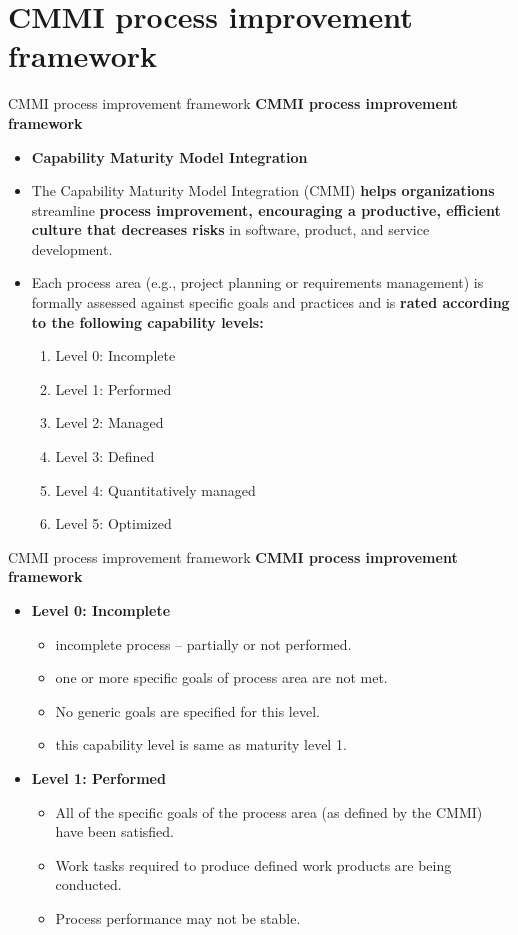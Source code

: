 \documentclass{beamer}
\begin{document}
\section{CMMI process improvement framework}
\begin{frame}{CMMI process improvement framework}
	\textbf{CMMI process improvement framework}
	\begin{itemize}
		\item \textbf{Capability Maturity Model Integration}
		\item The Capability Maturity Model Integration (CMMI) \textbf{helps organizations} streamline \textbf{process improvement, encouraging a productive, efficient culture that decreases risks} in software, product, and service development.
		\item Each process area (e.g., project planning or requirements management) is formally assessed against specific goals and practices and is \textbf{rated according to the following capability levels:}
		\begin{enumerate}
			\item Level 0: Incomplete 
			\item Level 1: Performed 
			\item Level 2: Managed 
			\item Level 3: Defined 
			\item Level 4: Quantitatively managed
			\item Level 5: Optimized 
		\end{enumerate}
	\end{itemize}
\end{frame}
\begin{frame}{CMMI process improvement framework}
	\textbf{CMMI process improvement framework}
	\begin{itemize}
		\item \textbf{Level 0: Incomplete} 
		\begin{itemize}
			\item incomplete process – partially or not performed.
			\item one or more specific goals of process area are not met.
			\item No generic goals are specified for this level.
			\item this capability level is same as maturity level 1.
		\end{itemize}
	\item \textbf{Level 1: Performed} 
	\begin{itemize}
		\item All of the specific goals of the process area (as defined by the CMMI) have been satisfied. 
		\item Work tasks required to produce 
		defined work products are being conducted. 
		\item Process performance may not be stable.
	\end{itemize}

	\end{itemize}
\end{frame}
\end{document}
